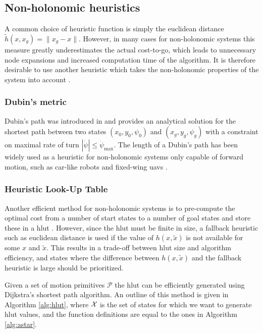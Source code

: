 \subsection{Non-holonomic heuristics}
A common choice of heuristic function is simply the euclidean distance $\tilde{h}(x, x_g)=\|x_g-x\|$. However, in many cases for
non-holonomic systems this measure greatly underestimates the actual cost-to-go, which leads to unnecessary node expansions and 
increased computation time of the algorithm. It is therefore desirable to use another heuristic which takes the non-holonomic properties 
of the system into account \cite{state_lattice_planning}.
\subsubsection{Dubin's metric}
Dubin's path was introduced in \cite{dubins} and provides an analytical solution for the
shortest path between two states $(x_0,y_0,\psi_0)$ and $(x_g,y_g,\psi_g)$ with a constraint on maximal rate of turn $|\dot{\psi}|\leq\dot{\psi}_{\text{max}}$.
The length of a Dubin's path has been widely used as a heuristic for non-holonomic systems only capable of forward motion, such as car-like robots and fixed-wing \acp{uav} \cite{2_phase_uav}.
\subsubsection{Heuristic Look-Up Table}\label{sec:hlut}
Another efficient method for non-holonomic systems is to pre-compute the optimal cost from a number of start states to 
a number of goal states and store these in a \ac{hlut} \cite{hlut}. However, since the \ac{hlut} 
must be finite in size, a fallback heuristic such as euclidean distance is used if the value of $h(x,\tilde{x})$ is not available for some $x$ and $\tilde{x}$.
This results in a trade-off between \ac{hlut} size and algorithm efficiency, and states where the difference between $h(x,\tilde{x})$ and the fallback heuristic 
is large should be prioritized.

Given a set of motion primitives $\mathcal{P}$ the \ac{hlut} can be efficiently generated using Dijkstra's shortest path algorithm. 
An outline of this method is given in Algorithm \ref{alg:hlut}, where $\mathcal{X}$ is the set of states for which we want to generate \ac{hlut} values, and the function definitions 
are equal to the ones in Algorithm \ref{alg:astar}.


